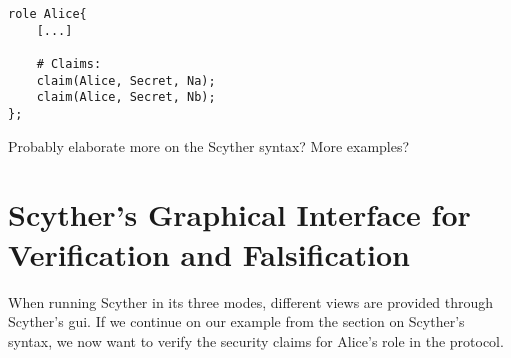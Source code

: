 \begin{lstlisting}
role Alice{
	[...]
	
	# Claims:
	claim(Alice, Secret, Na);
	claim(Alice, Secret, Nb);
};
\end{lstlisting}


Probably elaborate more on the Scyther syntax? More examples? 

\section{Scyther's Graphical Interface for Verification and Falsification}

When running Scyther in its three modes, different views are provided through Scyther's \gls{gui}. If we continue on our example from the section on Scyther's syntax, we now want to verify the security claims for Alice's role in the protocol.

